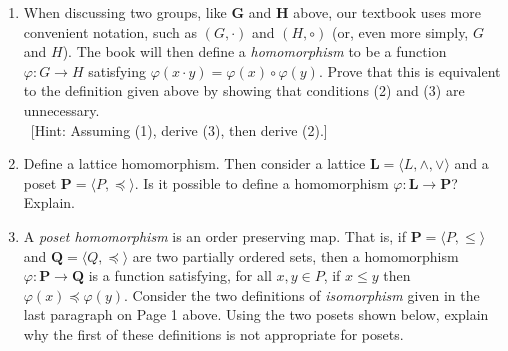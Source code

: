 \documentclass[12pt,reqno]{amsart}
\newcommand{\bL}{\ensuremath{\mathbf{L}}}
\newcommand{\bP}{\ensuremath{\mathbf{P}}}
\newcommand{\bQ}{\ensuremath{\mathbf{Q}}}
\newcommand{\bG}{\ensuremath{\mathbf{G}}}
\newcommand{\bH}{\ensuremath{\mathbf{H}}}
\newcommand{\meet}{\ensuremath{\wedge}}
\newcommand{\<}{\ensuremath{\langle}}
\renewcommand{\>}{\ensuremath{\rangle}}
\newcommand{\join}{\ensuremath{\vee}}
\begin{document}
\begin{enumerate}[{\bf 1.}]
\item When discussing two groups, like $\bG$ and $\bH$ above,
  our textbook uses more convenient notation, such as 
  $(G, \cdot)$ and $(H, \circ)$ (or, even more simply, $G$ and $H$).  The book will then
  define a \emph{homomorphism} to be a function $\varphi: G\rightarrow H$ satisfying
  $\varphi(x\cdot y) = \varphi(x) \circ \varphi(y)$.
  Prove that this is equivalent to the definition given above by showing that 
  conditions (2) and (3) are unnecessary.\\
  \ [Hint: Assuming (1), derive (3), then derive (2).]

\vskip1cm

\item
Define a lattice homomorphism.
Then consider a lattice $\bL = \<L, \meet, \join\>$ and a poset $\bP = \<P, \preccurlyeq\>$.
Is it possible to define a homomorphism $\varphi: \bL \rightarrow \bP$?  Explain.

\vskip1cm

\item
A \emph{poset homomorphism} is an order preserving map.  That is, if
$\bP = \<P, \leqslant\>$ and 
$\bQ = \<Q, \preccurlyeq\>$ are two partially 
ordered sets, then a homomorphism 
$\varphi: \bP \rightarrow \bQ$  is a function satisfying, for all $x, y\in P$, 
if $x \leqslant y$ then $\varphi(x)\preccurlyeq \varphi(y)$.
Consider the two definitions of \emph{isomorphism} given in the last paragraph
on Page 1 above.
Using the two posets shown below, explain why the first of these definitions is 
not appropriate for posets.

\vskip5mm

\begin{center}
\hskip3cm
\end{center}


\end{enumerate}
\end{document}
